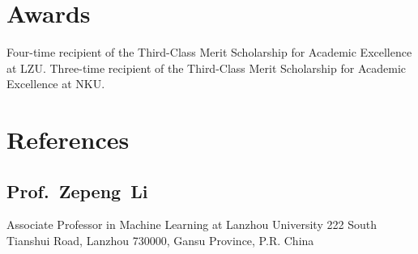 \documentclass[11pt,a4paper, final]{moderncv}
\newcommand{\spacesubsection}{\vspace{0.2cm}}
\begin{document}
\section{\textbf{Awards}}
		{Four-time recipient of the Third-Class Merit Scholarship for Academic Excellence at LZU.}
		{Three-time recipient of the Third-Class Merit Scholarship for Academic Excellence at NKU.}
\section{\textbf{References}}
	\subsection{Prof.~Zepeng~Li}
		\cvline{}
		{Associate Professor in Machine Learning at Lanzhou University}
		{222 South Tianshui Road, Lanzhou 730000, Gansu Province, P.R. China}
\end{document}
